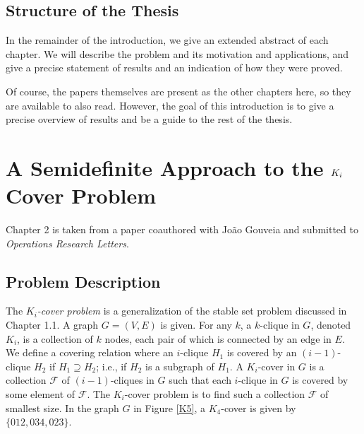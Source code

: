 \subsection{Structure of the Thesis}
In the remainder of the introduction, we give an extended abstract of each chapter. 
We will describe the problem and its motivation and applications, and give a precise statement of results and an indication of how they were proved.

Of course, the papers themselves are present as the other chapters here, so they are available to also read.
However, the goal of this introduction is to give a precise overview of results and be a guide to the rest of the thesis.

\section{A Semidefinite Approach to the $K_\MakeLowercase{i}$ Cover Problem}
Chapter 2 is taken from a paper coauthored with Jo\~ao Gouveia and submitted to \emph{Operations Research Letters}. 

\subsection{Problem Description}

The {\em $K_i$-cover problem} is a generalization of the stable set problem discussed in Chapter 1.1. 
A graph $G = (V,E)$ is given. 
For any $k$, a $k$-clique in $G$, denoted $K_i$, is a collection of $k$ nodes, each pair of which is connected by an edge in $E$.
We define a covering relation where an $i$-clique $H_1$ is covered by an $(i-1)$-clique $H_2$ if $H_1 \supseteq H_2$; i.e., if $H_2$ is a subgraph of $H_1$. 
A $K_i$-cover in $G$ is a collection $\mathcal{F}$ of $(i-1)$-cliques in $G$ such that each $i$-clique in $G$ is covered by some element of $\mathcal{F}$. 
The $K_i$-cover problem is to find such a collection $\mathcal{F}$ of smallest size.
In the graph $G$ in Figure \ref{K5}, a $K_4$-cover is given by $\{012,034,023\}$.

